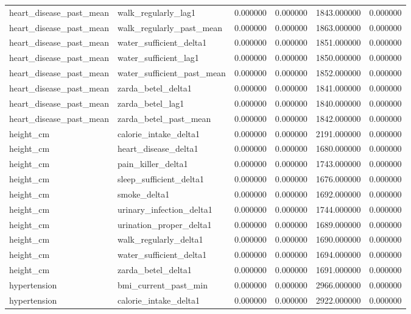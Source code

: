 \begin{longtable}{llrrrr}
heart\_disease\_past\_mean & walk\_regularly\_lag1 & 0.000000 & 0.000000 & 1843.000000 & 0.000000 \\
heart\_disease\_past\_mean & walk\_regularly\_past\_mean & 0.000000 & 0.000000 & 1863.000000 & 0.000000 \\
heart\_disease\_past\_mean & water\_sufficient\_delta1 & 0.000000 & 0.000000 & 1851.000000 & 0.000000 \\
heart\_disease\_past\_mean & water\_sufficient\_lag1 & 0.000000 & 0.000000 & 1850.000000 & 0.000000 \\
heart\_disease\_past\_mean & water\_sufficient\_past\_mean & 0.000000 & 0.000000 & 1852.000000 & 0.000000 \\
heart\_disease\_past\_mean & zarda\_betel\_delta1 & 0.000000 & 0.000000 & 1841.000000 & 0.000000 \\
heart\_disease\_past\_mean & zarda\_betel\_lag1 & 0.000000 & 0.000000 & 1840.000000 & 0.000000 \\
heart\_disease\_past\_mean & zarda\_betel\_past\_mean & 0.000000 & 0.000000 & 1842.000000 & 0.000000 \\
height\_cm & calorie\_intake\_delta1 & 0.000000 & 0.000000 & 2191.000000 & 0.000000 \\
height\_cm & heart\_disease\_delta1 & 0.000000 & 0.000000 & 1680.000000 & 0.000000 \\
height\_cm & pain\_killer\_delta1 & 0.000000 & 0.000000 & 1743.000000 & 0.000000 \\
height\_cm & sleep\_sufficient\_delta1 & 0.000000 & 0.000000 & 1676.000000 & 0.000000 \\
height\_cm & smoke\_delta1 & 0.000000 & 0.000000 & 1692.000000 & 0.000000 \\
height\_cm & urinary\_infection\_delta1 & 0.000000 & 0.000000 & 1744.000000 & 0.000000 \\
height\_cm & urination\_proper\_delta1 & 0.000000 & 0.000000 & 1689.000000 & 0.000000 \\
height\_cm & walk\_regularly\_delta1 & 0.000000 & 0.000000 & 1690.000000 & 0.000000 \\
height\_cm & water\_sufficient\_delta1 & 0.000000 & 0.000000 & 1694.000000 & 0.000000 \\
height\_cm & zarda\_betel\_delta1 & 0.000000 & 0.000000 & 1691.000000 & 0.000000 \\
hypertension & bmi\_current\_past\_min & 0.000000 & 0.000000 & 2966.000000 & 0.000000 \\
hypertension & calorie\_intake\_delta1 & 0.000000 & 0.000000 & 2922.000000 & 0.000000 \\

\end{longtable}
